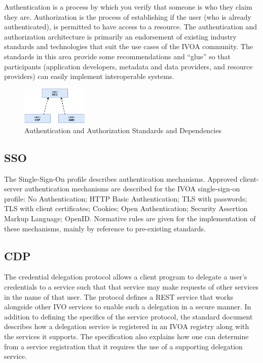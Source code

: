 \documentclass[11pt,a4paper]{ivoa}
\begin{document}
Authentication is a process by which you verify that someone is who they claim they 
are. Authorization is the process of establishing if the user (who is already authenticated), 
is permitted to have access to a resource. The authentication and authorization architecture 
is primarily an endorsement of existing
industry standards and technologies that suit the use cases of the IVOA community. The standards
in this area provide some recommendations and ``glue'' so that participants (application
developers, metadata and data providers, and resource providers) can easily implement interoperable
systems.

\begin{figure}[h]
\centering
\includegraphics[width=0.28\textwidth]{ivoa-arch-auth.pdf}
\caption{Authentication and Authorization Standards and Dependencies}
\label{fig:authdeps}
\end{figure}

\subsection{SSO}

The Single-Sign-On profile describes authentication mechanisms. Approved client-server 
authentication mechanisms are described for the IVOA single-sign-on profile: No Authentication; 
HTTP Basic Authentication; TLS with passwords; TLS with client certificates; Cookies; Open 
Authentication; Security Assertion Markup Language; OpenID. Normative rules are given for 
the implementation of these mechanisms, mainly by reference to pre-existing standards.

\subsection{CDP}

The credential delegation protocol allows a client program to delegate a user's credentials 
to a service such that that service may make requests of other services in the name of that 
user. The protocol defines a REST service that works alongside other IVO services to enable 
such a delegation in a secure manner. In addition to defining the specifics of the service 
protocol, the standard document describes how a delegation service is registered in an IVOA registry 
along with the services it supports. The specification also explains how one can determine 
from a service registration that it requires the use of a supporting delegation service. 
\end{document}
